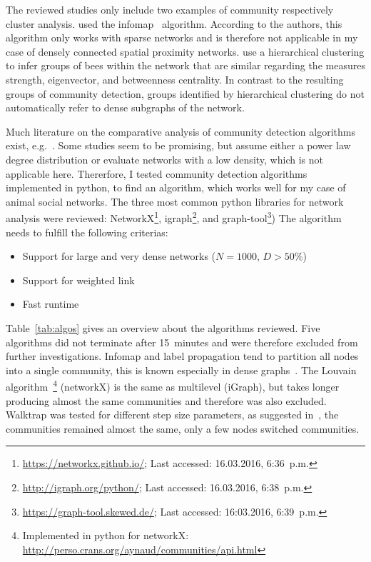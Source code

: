 The reviewed studies only include two examples of community respectively cluster analysis. \textcite{mersch2013tracking} used the infomap~\cite{rosvall2009map,rosvall2007information} algorithm. According to the authors, this algorithm only works with sparse networks and is therefore not applicable in my case of densely connected spatial proximity networks. \textcite{baracchi2014socio} use a hierarchical clustering to infer groups of bees within the network that are similar regarding the measures strength, eigenvector, and betweenness centrality. In contrast to the resulting groups of community detection, groups identified by hierarchical clustering do not automatically refer to dense subgraphs of the network.

Much literature on the comparative analysis of community detection algorithms exist, e.g.~\cite{yang2016comparative, harenberg2014community}. Some studies seem to be promising, but assume either a power law degree distribution or
evaluate networks with a low density, which is not applicable here.
Thererfore, I tested community detection algorithms implemented in python, to find an algorithm, which works well for my case of animal social networks. The three most common python libraries for network analysis were reviewed: NetworkX\footnote{\url{https://networkx.github.io/}; Last accessed: 16.03.2016, 6:36~p.m.}, igraph\footnote{\url{http://igraph.org/python/}; Last accessed: 16.03.2016, 6:38~p.m.}, and graph-tool\footnote{\url{https://graph-tool.skewed.de/}; Last accessed: 16:03.2016, 6:39~p.m.})
The algorithm needs to fulfill the following criterias:

\begin{itemize}
\item Support for large and very dense networks ($N=1000$, $D>50\%$)
\item Support for weighted link
\item Fast runtime
\end{itemize}

Table~\ref{tab:algos} gives an overview about the algorithms reviewed. Five algorithms did not terminate after 15~minutes and were therefore excluded from further investigations. Infomap and label propagation tend to partition all nodes into a single community, this is known especially in dense graphs~\cite{yang2016comparative, fortunato2010community}.
The Louvain algorithm~\footnote{Implemented in python for networkX: \url{http://perso.crans.org/aynaud/communities/api.html}} (networkX) is the same as multilevel (iGraph), but takes longer producing almost the same communities and therefore was also excluded. Walktrap was tested for different step size parameters, as suggested in~\cite{pons2005computing}, the communities remained almost the same, only a few nodes switched communities.

